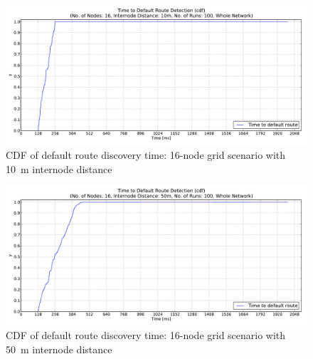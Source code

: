 \begin{figure}[htpb]
  \begin{center}
   \vspace{-20pt}
    \leavevmode
      \includegraphics[scale=0.38]
      {Pics/results/16/MRHOF/grid/dist10_montecarlo_cdf_hist.pdf}
   \caption{CDF of default route discovery time: 16-node grid scenario with 10~m internode distance}
   \label{fig:16_MRHOF_grid_10_cdf}
  \end{center}
\end{figure}

\begin{figure}[htpb]
  \begin{center}
   \vspace{-20pt}
    \leavevmode
      \includegraphics[scale=0.38]
      {Pics/results/16/MRHOF/grid/dist50_montecarlo_cdf_hist.pdf}
   \caption{CDF of default route discovery time: 16-node grid scenario with 50~m internode distance}
   \label{fig:16_MRHOF_grid_50_cdf}
  \end{center}
\end{figure}

